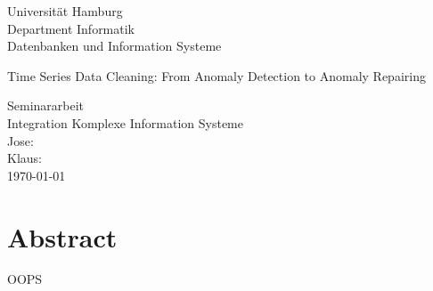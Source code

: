 \documentclass[12pt,twoside]{article}
\newcommand{\trtype}{Seminararbeit} %
\newcommand{\trcourse}{Integration Komplexe Information Systeme}
\newcommand{\trtitle}{Time Series Data Cleaning: From Anomaly Detection to
Anomaly Repairing}
\newcommand{\trarbeitsbereich}{Datenbanken und Information Systeme}
\newcommand{\trdate}{\today}
\theoremstyle{plain}
\theoremstyle{definition}
\theoremstyle{remark}
\begin{document}
\renewcommand{\headheight}{14.5pt}

\begin{titlepage}
	\begin{flushleft}
		Universit\"at Hamburg\\
		Department Informatik\\
		\trarbeitsbereich\\
	\end{flushleft}
	\vspace{2.5cm}
	\begin{center}
		\huge \trtitle\\
	\end{center}
	\vspace{1.5cm}
	\begin{center}
		\normalsize\trtype\\
		[0.2cm]
		\Large\trcourse\\
		[1.0cm]
        \normalsize Jose: \\
		[0.2cm]
        \normalsize Klaus: \\
		[0.2cm]
		\Large \trdate
	\end{center}
	\vfill
\end{titlepage}

\thispagestyle{empty}
\hspace{1cm}



\section*{Abstract}
OOPS

\newpage
\setcounter{tocdepth}{3}%
\tableofcontents
{}
\newpage



\end{document}
